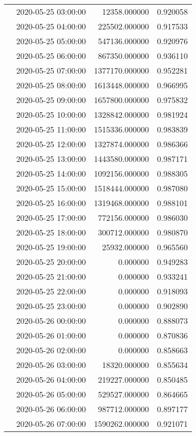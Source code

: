 \begin{tabular}{llrr}
 & 2020-05-25 03:00:00 & 12358.000000 & 0.920058 \\
 & 2020-05-25 04:00:00 & 225502.000000 & 0.917533 \\
 & 2020-05-25 05:00:00 & 547136.000000 & 0.920976 \\
 & 2020-05-25 06:00:00 & 867350.000000 & 0.936110 \\
 & 2020-05-25 07:00:00 & 1377170.000000 & 0.952281 \\
 & 2020-05-25 08:00:00 & 1613448.000000 & 0.966995 \\
 & 2020-05-25 09:00:00 & 1657800.000000 & 0.975832 \\
 & 2020-05-25 10:00:00 & 1328842.000000 & 0.981924 \\
 & 2020-05-25 11:00:00 & 1515336.000000 & 0.983839 \\
 & 2020-05-25 12:00:00 & 1327874.000000 & 0.986366 \\
 & 2020-05-25 13:00:00 & 1443580.000000 & 0.987171 \\
 & 2020-05-25 14:00:00 & 1092156.000000 & 0.988305 \\
 & 2020-05-25 15:00:00 & 1518444.000000 & 0.987080 \\
 & 2020-05-25 16:00:00 & 1319468.000000 & 0.988101 \\
 & 2020-05-25 17:00:00 & 772156.000000 & 0.986030 \\
 & 2020-05-25 18:00:00 & 300712.000000 & 0.980870 \\
 & 2020-05-25 19:00:00 & 25932.000000 & 0.965560 \\
 & 2020-05-25 20:00:00 & 0.000000 & 0.949283 \\
 & 2020-05-25 21:00:00 & 0.000000 & 0.933241 \\
 & 2020-05-25 22:00:00 & 0.000000 & 0.918093 \\
 & 2020-05-25 23:00:00 & 0.000000 & 0.902890 \\
 & 2020-05-26 00:00:00 & 0.000000 & 0.888073 \\
 & 2020-05-26 01:00:00 & 0.000000 & 0.870836 \\
 & 2020-05-26 02:00:00 & 0.000000 & 0.858663 \\
 & 2020-05-26 03:00:00 & 18320.000000 & 0.855634 \\
 & 2020-05-26 04:00:00 & 219227.000000 & 0.850485 \\
 & 2020-05-26 05:00:00 & 529527.000000 & 0.864665 \\
 & 2020-05-26 06:00:00 & 987712.000000 & 0.897177 \\
 & 2020-05-26 07:00:00 & 1590262.000000 & 0.921071 \\

\end{tabular}
